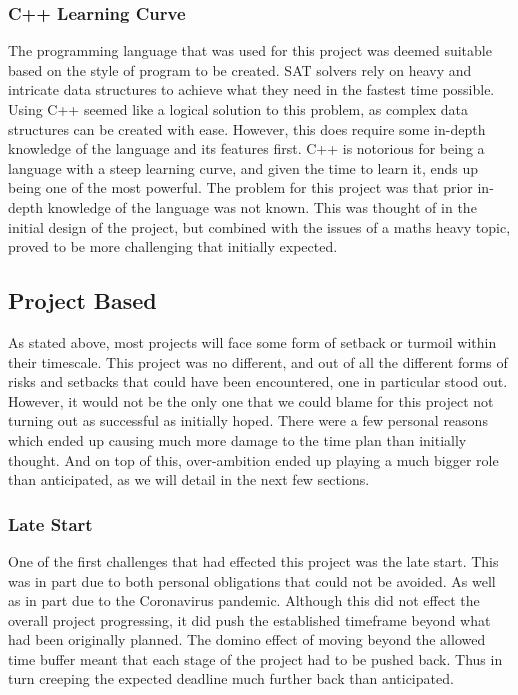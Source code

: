 \documentclass{article}
\begin{document}
\subsubsection{C++ Learning Curve}
The programming language that was used for this project was deemed suitable based on the style of program to be created. SAT
solvers rely on heavy and intricate data structures to achieve what they need in the fastest time possible. Using C++ seemed like
a logical solution to this problem, as complex data structures can be created with ease. However, this does require some in-depth
knowledge of the language and its features first. C++ is notorious for being a language with a steep learning curve, and given the
time to learn it, ends up being one of the most powerful. The problem for this project was that prior in-depth knowledge of the
language was not known. This was thought of in the initial design of the project, but combined with the issues of a maths heavy
topic, proved to be more challenging that initially expected.

\subsection{Project Based}
As stated above, most projects will face some form of setback or turmoil within their timescale. This project was no different,
and out of all the different forms of risks and setbacks that could have been encountered, one in particular stood out. However,
it would not be the only one that we could blame for this project not turning out as successful as initially hoped. There were a
few personal reasons which ended up causing much more damage to the time plan than initially thought. And on top of this,
over-ambition ended up playing a much bigger role than anticipated, as we will detail in the next few sections.

\subsubsection{Late Start}
One of the first challenges that had effected this project was the late start. This was in part due to both personal obligations
that could not be avoided. As well as in part due to the Coronavirus pandemic. Although this did not effect the overall project
progressing, it did push the established timeframe beyond what had been originally planned. The domino effect of moving beyond the
allowed time buffer meant that each stage of the project had to be pushed back. Thus in turn creeping the expected deadline much
further back than anticipated.
\end{document}
